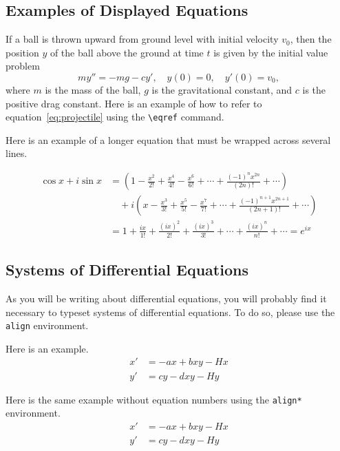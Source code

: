 \documentclass{codee}
\theoremstyle{definition}
\theoremstyle{remark}
\numberwithin{equation}{section}
\begin{document}
\subsection{Examples of Displayed Equations}

If a ball is thrown upward from ground level with initial
velocity $v_0$, then the position $y$ of
the ball above the ground at time $t$ is given by the initial value problem
\begin{equation}\label{eq:projectile}
my'' = -mg - cy',\quad y(0)=0,\quad y'(0)=v_0,
\end{equation} 
where $m$ is the mass of the ball, $g$ is the gravitational constant,
and $c$ is the positive drag constant. Here is an example of how to
refer to equation~\eqref{eq:projectile} using the
\texttt{\textbackslash eqref} command.

Here is an example of a longer equation that must be wrapped across
several lines.

\begin{align*}
  \cos x+i\sin x &=
  \left(1-\frac{x^2}{2!}+\frac{x^4}{4!}-\frac{x^6}{6!}+\cdots+\frac{(-1)^nx^{2n}}{(2n)!}+\cdots\right) \\
&\quad+i\left(x-\frac{x^3}{3!}+\frac{x^5}{5!}-\frac{x^7}{7!}+\cdots+\frac{(-1)^{n+1}x^{2n+1}}{(2n+1)!}+\cdots\right) \\
&=1+\frac{ix}{1!}+\frac{(ix)^2}{2!}+\frac{(ix)^3}{3!}+\cdots+\frac{(ix)^n}{n!}+\cdots=e^{ix}
\end{align*}

\subsection{Systems of Differential Equations}

As you will be writing about differential equations, you will probably
find it necessary to typeset systems of differential equations. To do
so, please use the \texttt{align} environment.

Here is an example.
\begin{align}
    x' &= -ax + bxy - Hx\\
    y' &= cy - dxy - Hy
\end{align}

Here is the same example without equation numbers using the \texttt{align*} environment.
\begin{align*}
    x' &= -ax + bxy - Hx\\
    y' &= cy - dxy - Hy
\end{align*}
\end{document}

